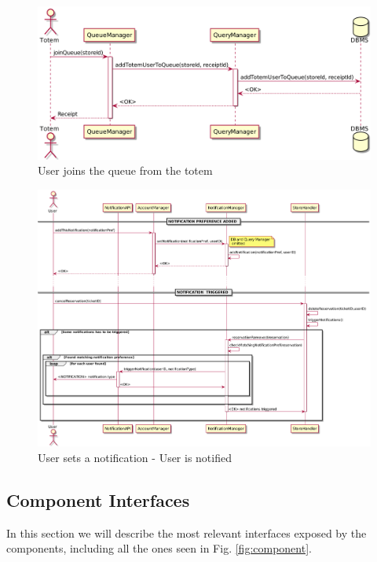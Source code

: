 \begin{figure}[H]
    \includegraphics[width=\linewidth]{uml/seq_join_queue_totem.png}
    \caption{User joins the queue from the totem}
    \label{fig:seq_join_queue_totem}
\end{figure}

\begin{figure}[H]
    \includegraphics[width=\linewidth]{uml/seq_user_gets_notified.png}
    \caption{User sets a notification - User is notified}
    \label{fig:seq_user_gets_notified}
\end{figure}

\newpage

\subsection{Component Interfaces}
In this section we will describe the most relevant interfaces exposed by the components, including all the ones seen in Fig. \ref{fig:component}.

